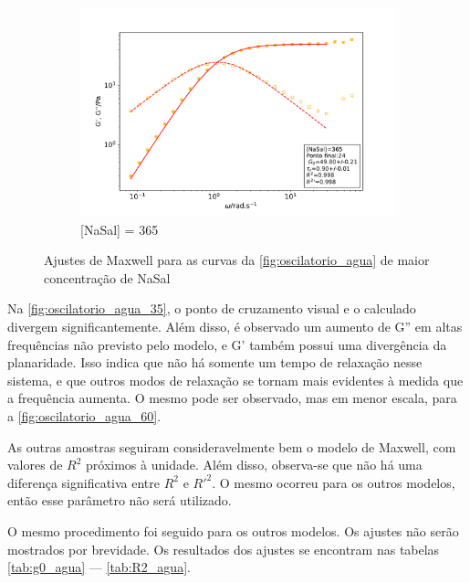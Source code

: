 \begin{figure}[h]
			\begin{subfigure}[t]{0.5\textwidth}
				\includegraphics[width=\textwidth]{imagens/reologia/oscilatorio_agua_365}
				\caption{[NaSal] = 365\mM}
				\label{fig:oscilatorio_agua_365}
			\end{subfigure}
		
			\caption{Ajustes de Maxwell para as curvas da \autoref{fig:oscilatorio_agua} de maior concentração de NaSal}
			\label{fig:oscilatorio_agua_maxwell2}
		\end{figure}
	
		Na \autoref{fig:oscilatorio_agua_35}, o ponto de cruzamento visual e o calculado divergem significantemente. Além disso, é observado um aumento de G'' em altas frequências não previsto pelo modelo, e G' também possui uma divergência da planaridade. Isso indica que não há somente um tempo de relaxação nesse sistema, e que outros modos de relaxação se tornam mais evidentes à medida que a frequência aumenta. O mesmo pode ser observado, mas em menor escala, para a \autoref{fig:oscilatorio_agua_60}. %
		
		As outras amostras seguiram consideravelmente bem o modelo de Maxwell, com valores de \(R^2\) próximos à unidade. Além disso, observa-se que não há uma diferença significativa entre \(R^2\) e \(R\mathrm{'}^2\). O mesmo ocorreu para os outros modelos, então esse parâmetro não será utilizado.
		
		O mesmo procedimento foi seguido para os outros modelos. Os ajustes não serão mostrados por brevidade. Os resultados dos ajustes se encontram nas tabelas \ref{tab:g0_agua} --- \ref{tab:R2_agua}.
		
